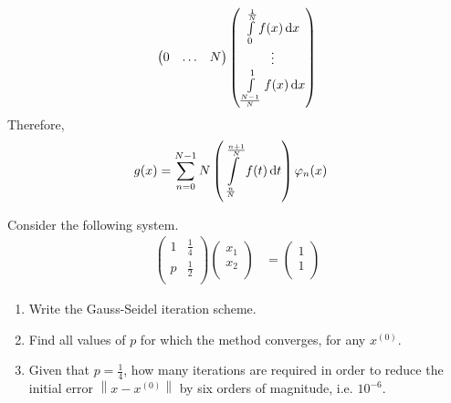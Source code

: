 \documentclass[fleqn, a4paper, 12pt, twoside, titlepage]{article}
\theoremstyle{definition}
\theoremstyle{theorem}
\begin{document}
\begin{solution}
\begin{align*}
\begin{pmatrix}
				0 & \dots & N\\
			\end{pmatrix}
			\begin{pmatrix}
				\int\limits_{0}^{\frac{1}{N}} f(x) \dif x\\
				\vdots\\
				\int\limits_{\frac{N - 1}{N}}^{1} f(x) \dif x\\
			\end{pmatrix}
	\end{align*}
	Therefore,
	\begin{align*}
		g(x) &= \sum\limits_{n = 0}^{N - 1} N \left( \int\limits_{\frac{n}{N}}^{\frac{n + 1}{N}} f(t) \dif t \right) \varphi_n(x)
	\end{align*}
\end{solution}

\begin{question}
	Consider the following system.
	\begin{align*}
			\begin{pmatrix}
				1 & \frac{1}{4}\\
				p & \frac{1}{2}\\
			\end{pmatrix}
			\begin{pmatrix}
				x_1\\
				x_2\\
			\end{pmatrix}
		&=
			\begin{pmatrix}
				1\\
				1\\
			\end{pmatrix}
	\end{align*}
	\begin{enumerate}
		\item Write the Gauss-Seidel iteration scheme.
		\item Find all values of $p$ for which the method converges, for any $x^{(0)}$.
		\item Given that $p = \frac{1}{4}$, how many iterations are required in order to reduce the initial error $\left\| x - x^{(0)} \right\|$ by six orders of magnitude, i.e. $10^{-6}$.
	\end{enumerate}
\end{question}
\end{document}
